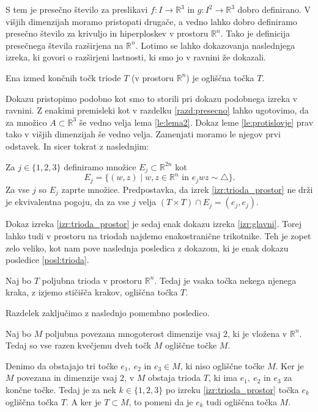 \documentclass[mat1]{fmfdelo}
\newcommand{\R}{\mathbb R}
\begin{document}
S tem je presečno število za preslikavi $f \colon I \to \R^3$ in $g \colon I^2 \to \R^3$ dobro definirano. V višjih dimenzijah moramo pristopati drugače, a vedno lahko dobro definiramo presečno število za krivuljo in hiperploskev v prostoru $\R^n$. Tako je definicija presečnega števila razširjena na $\R^n$. Lotimo se lahko dokazovanja naslednjega izreka, ki govori o razširjeni lastnosti, ki smo jo v ravnini že dokazali.

\begin{izrek}\label{izr:trioda_prostor}
Ena izmed končnih točk triode $T$ (v prostoru $\R^n$) je ogliščna točka $T$.
\end{izrek} 

Dokazu pristopimo podobno kot smo to storili pri dokazu podobnega izreka v ravnini. Z enakimi premisleki kot v razdelku \ref{razd:presecno} lahko ugotovimo, da za množico $A \subset \R^3$ še vedno velja lema \ref{le:lema2}. Dokaz leme \ref{le:protislovje} prav tako v višjih dimenzijah še vedno velja. Zamenjati moramo le njegov prvi odstavek. In sicer tokrat z  naslednjim:

Za $j \in \{1, 2, 3\}$ definiramo množice $E_j \subset \R^{2n}$ kot 
\[
E_j = \{ (w, z) \mid w, z \in \R^n \text{ in } e_jwz \sim \triangle \}.
\] 
Za vse $j$ so $E_j$ zaprte množice. Predpostavka, da izrek \ref{izr:trioda_prostor} ne drži je ekvivalentna pogoju, da za vse $j$ velja $(T \times T) \cap E_j = (e_j, e_j)$.

Dokaz izreka \ref{izr:trioda_prostor} je sedaj enak dokazu izreka \ref{izr:glavni}. Torej lahko tudi v prostoru na triodah najdemo enakostranične trikotnike. Teh je zopet zelo veliko, kot nam pove naslednja posledica z dokazom, ki je enak dokazu posledice \ref{posl:trioda}.

\begin{posledica}
Naj bo $T$ poljubna trioda v prostoru $\R^n$. Tedaj je vsaka točka nekega njenega kraka, z izjemo stičišča krakov, ogliščna točka $T$.
\end{posledica}

Razdelek zaključimo z naslednjo pomembno posledico.

\begin{posledica}
Naj bo $M$ poljubna povezana mnogoterost dimenzije vsaj $2$, ki je vložena v $\R^n$. Tedaj so vse razen kvečjemu dveh točk $M$ ogliščne točke $M$.
\end{posledica}

\proof
Denimo da obstajajo tri točke $e_1,\ e_2$ in $e_3 \in M$, ki niso ogliščne točke $M$. Ker je $M$ povezana in dimenzije vsaj $2$, v $M$ obstaja trioda $T$, ki ima $e_1,\ e_2$ in $e_3$ za končne točke. Tedaj je za nek $k \in \{1, 2, 3\}$ po izreku \ref{izr:trioda_prostor} točka $e_k$ ogliščna točka $T$. A ker je $T \subset M$, to pomeni da je $e_k$ tudi ogliščna točka $M$.
\endproof
\end{document}
